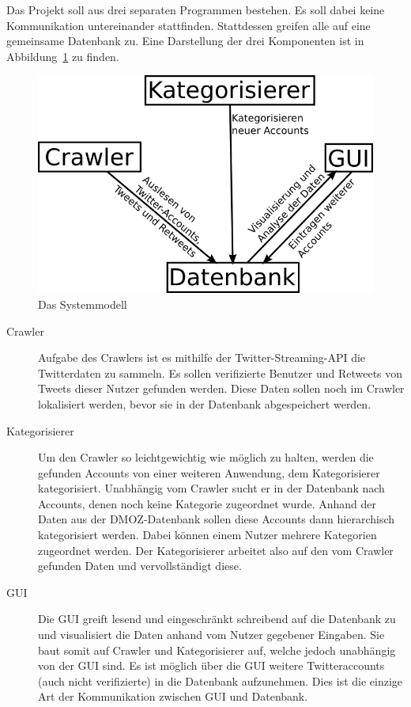
Das Projekt soll aus drei separaten Programmen bestehen. Es soll dabei keine Kommunikation untereinander stattfinden. Stattdessen greifen alle auf eine gemeinsame Datenbank zu. Eine Darstellung der drei Komponenten ist in Abbildung~\ref{c:systemmodell} zu finden.

\begin{figure}[h]
	\centering
	\includegraphics[scale=2]{img/Systemmodell.png}
	\caption{Das Systemmodell}
	\label{c:systemmodell}
\end{figure}

\begin{description}
	\item[Crawler] Aufgabe des Crawlers ist es mithilfe der Twitter-Streaming-API die Twitterdaten zu sammeln. Es sollen verifizierte Benutzer und Retweets von Tweets dieser Nutzer gefunden werden. Diese Daten sollen noch im Crawler lokalisiert werden, bevor sie in der Datenbank abgespeichert werden.
	\item[Kategorisierer] Um den Crawler so leichtgewichtig wie möglich zu halten, werden die gefunden Accounts von einer weiteren Anwendung, dem Kategorisierer kategorisiert. Unabhängig vom Crawler sucht er in der Datenbank nach Accounts, denen noch keine Kategorie zugeordnet wurde. Anhand der Daten aus der DMOZ-Datenbank sollen diese Accounts dann hierarchisch kategorisiert werden. Dabei können einem Nutzer mehrere Kategorien zugeordnet werden. Der Kategorisierer arbeitet also auf den vom Crawler gefunden Daten und vervollständigt diese.
	\item[GUI] Die GUI greift lesend und eingeschränkt schreibend auf die Datenbank zu und visualisiert die Daten anhand vom Nutzer gegebener Eingaben. Sie baut somit auf Crawler und Kategorisierer auf, welche jedoch unabhängig von der GUI sind. Es ist möglich über die GUI weitere Twitteraccounts (auch nicht verifizierte) in die Datenbank aufzunehmen. Dies ist die einzige Art der Kommunikation zwischen GUI und Datenbank.
\end{description}


